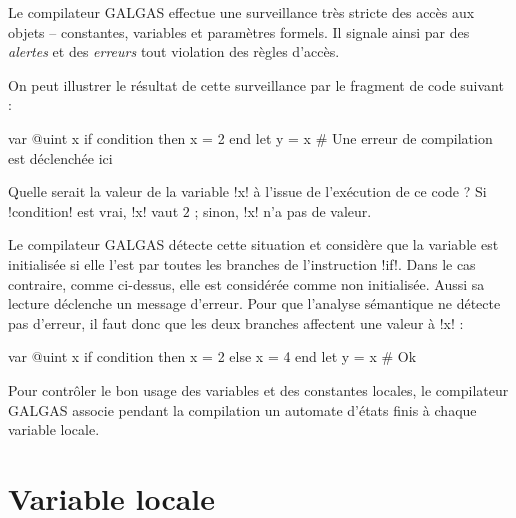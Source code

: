 
\newcommand\FlecheEtatInitial[2]{
  \node[#2 of #1,draw=black,circle,thick,fill=\FondAutomate] (Z) {};
  \draw[-stealth,thick,black] (Z) -- (#1);
}


Le compilateur GALGAS effectue une surveillance très stricte des accès aux objets -- constantes, variables et paramètres formels. Il signale ainsi par des \emph{alertes} et des \emph{erreurs} tout violation des règles d'accès.

On peut illustrer le résultat de cette surveillance par le fragment de code suivant :
\begin{galgas3}
var @uint x
if condition then
  x = 2
end
let y = x # Une erreur de compilation est déclenchée ici
\end{galgas3}

Quelle serait la valeur de la variable \ggst!x! à l'issue de l'exécution de ce code ? Si \ggst!condition! est vrai, \ggst!x! vaut $2$ ; sinon, \ggst!x! n'a pas de valeur.

Le compilateur GALGAS détecte cette situation et considère que la variable est initialisée si elle l'est par toutes les branches de l'instruction \ggst!if!. Dans le cas contraire, comme ci-dessus, elle est considérée comme non initialisée. Aussi sa lecture déclenche un message d'erreur. Pour que l'analyse sémantique ne détecte pas d'erreur, il faut donc que les deux branches affectent une valeur à \ggst!x! :

\begin{galgas3}
var @uint x
if condition then
  x = 2
else
  x = 4
end
let y = x # Ok
\end{galgas3}

Pour contrôler le bon usage des variables et des constantes locales, le compilateur GALGAS associe pendant la compilation un automate d'états finis à chaque variable locale.














\section{Variable locale}

